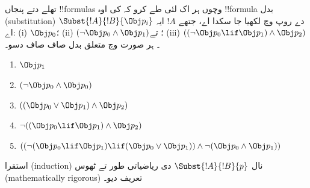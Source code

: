 \documentclass[../../../include/open-logic-section]{subfiles}
\begin{document}
\begin{prob} تھلے دتے پنجاں !!{formula}s وچوں ہر اک لئی طے کرو کہ کی
 اوہ !!{formula} بدل (substitution) \( \Subst{!A}{!B}{\Obj p_i} \) دے روپ وچ لکھیا
 جا سکدا اے، جتھے \( !A \) ایہ اے: (i) \( \Obj p_0 \)؛ (ii)
 \( ( \lnot \Obj p_0 \land \Obj p_1) \)؛ تے (iii)
 \( ( ( \lnot \Obj p_0 \lif \Obj p_1 ) \land \Obj p_2 ) \)۔ ہر
 صورت وچ متعلق بدل صاف صاف دسو۔
  \begin{enumerate}
    \item \( \Obj p_1 \)
    \item \( ( \lnot \Obj p_0 \land \Obj p_0 ) \)
    \item \( ( ( \Obj p_0 \lor \Obj p_1 ) \land \Obj p_2 )  \)
    \item \( \lnot ( ( \Obj p_0 \lif \Obj p_1 ) \land \Obj p_2 ) \)
    \item \( (( \lnot ( \Obj p_0 \lif \Obj p_1 ) \lif ( \Obj p_0 \lor \Obj p_1 )) \land \lnot ( \Obj p_0 \land \Obj p_1 )) \)
  \end{enumerate}
\end{prob}

\begin{prob}
استقرا (induction) نال $\Subst{!A}{!B}{p}$ دی ریاضیاتی طور تے ٹھوس
(mathematically rigorous) تعریف دیو۔
\end{prob}
\end{document}
